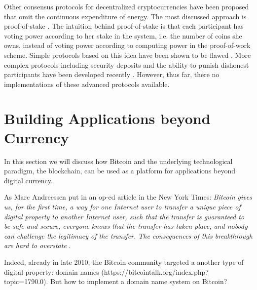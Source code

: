 Other consensus protocols for decentralized cryptocurrencies have been proposed that omit the continuous expenditure of energy. The most discussed approach is proof-of-stake \parencite{pos2011}. The intuition behind proof-of-stake is that each participant has voting power according to her stake in the system, i.e. the number of coins she owns, instead of voting power according to computing power in the proof-of-work scheme. Simple protocols based on this idea have been shown to be flawed \parencite{poelstra2014}. More complex protocols including security deposits and the ability to punish dishonest participants have been developed recently \parencite{kiayias2016,bentov2016snowwhite}. However, thus far, there no implementations of these advanced protocols available. 




\section{Building Applications beyond Currency}
\label{sec:apps_beyond_currency}

In this section we will discuss how Bitcoin and the underlying technological paradigm, the blockchain, can be used as a platform for applications beyond digital currency. 



As Marc Andreessen put in an op-ed article in the New York Times: \emph{Bitcoin gives us, for the first time, a way for one Internet user to transfer a unique piece of digital property to another Internet user, such that the transfer is guaranteed to be safe and secure, everyone knows that the transfer has taken place, and nobody can challenge the legitimacy of the transfer. The consequences of this breakthrough are hard to overstate} \cite{andreessen2014}.

Indeed, already in late 2010, the Bitcoin community targeted a another type of digital property: domain names (https://bitcointalk.org/index.php?topic=1790.0). But how to implement a domain name system on Bitcoin?

